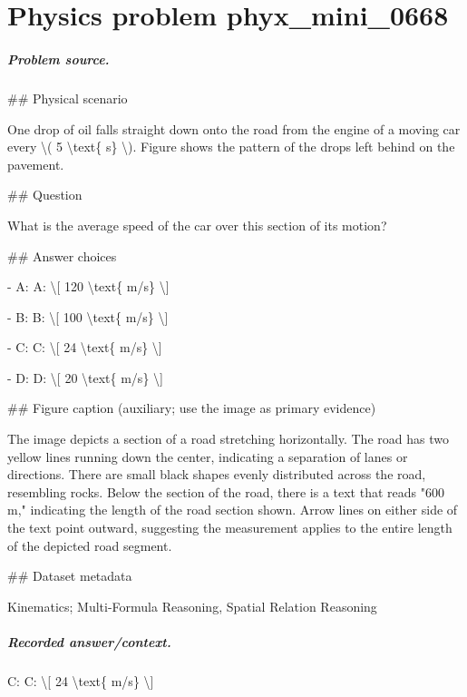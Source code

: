 
\chapter{Physics problem phyx\_mini\_0668}
\label{ch:PhyXMiniProblems_problem_phyx_mini_0668}

\paragraph{Problem source.}
\#\# Physical scenario

One drop of oil falls straight down onto the road from the engine of a moving car every \textbackslash{}( 5 \textbackslash{}text\{ s\} \textbackslash{}). Figure shows the pattern of the drops left behind on the pavement.

\#\# Question

What is the average speed of the car over this section of its motion?

\#\# Answer choices

- A: A: \textbackslash{}[ 120 \textbackslash{}text\{ m/s\} \textbackslash{}]

- B: B: \textbackslash{}[ 100 \textbackslash{}text\{ m/s\} \textbackslash{}]

- C: C: \textbackslash{}[ 24 \textbackslash{}text\{ m/s\} \textbackslash{}]

- D: D: \textbackslash{}[ 20 \textbackslash{}text\{ m/s\} \textbackslash{}]

\#\# Figure caption (auxiliary; use the image as primary evidence)

The image depicts a section of a road stretching horizontally. The road has two yellow lines running down the center, indicating a separation of lanes or directions. There are small black shapes evenly distributed across the road, resembling rocks. Below the section of the road, there is a text that reads "600 m," indicating the length of the road section shown. Arrow lines on either side of the text point outward, suggesting the measurement applies to the entire length of the depicted road segment.

\#\# Dataset metadata

Kinematics; Multi-Formula Reasoning, Spatial Relation Reasoning

\paragraph{Recorded answer/context.}
C: C: \textbackslash{}[ 24 \textbackslash{}text\{ m/s\} \textbackslash{}]

